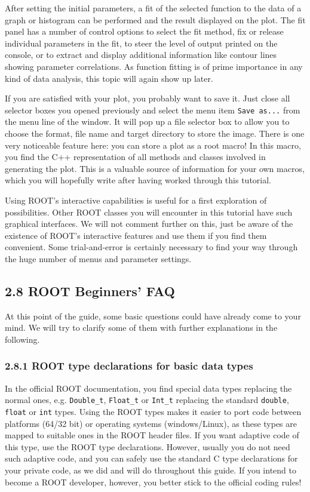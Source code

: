 \documentclass{article}
\begin{document}
After setting the initial parameters, a fit of the selected function to
the data of a graph or histogram can be performed and the result
displayed on the plot. The fit panel has a number of control options to
select the fit method, fix or release individual parameters in the fit,
to steer the level of output printed on the console, or to extract and
display additional information like contour lines showing parameter
correlations. As function fitting is of prime importance in any kind of
data analysis, this topic will again show up later.

If you are satisfied with your plot, you probably want to save it. Just
close all selector boxes you opened previously and select the menu item
\texttt{Save\ as...} from the menu line of the window. It will pop up a
file selector box to allow you to choose the format, file name and
target directory to store the image. There is one very noticeable
feature here: you can store a plot as a root macro! In this macro, you
find the C++ representation of all methods and classes involved in
generating the plot. This is a valuable source of information for your
own macros, which you will hopefully write after having worked through
this tutorial.

Using ROOT's interactive capabilities is useful for a first exploration
of possibilities. Other ROOT classes you will encounter in this tutorial
have such graphical interfaces. We will not comment further on this,
just be aware of the existence of ROOT's interactive features and use
them if you find them convenient. Some trial-and-error is certainly
necessary to find your way through the huge number of menus and
parameter settings.

\subsection{2.8 ROOT Beginners' FAQ}\label{root-beginners-faq}

At this point of the guide, some basic questions could have already come
to your mind. We will try to clarify some of them with further
explanations in the following.

\subsubsection{2.8.1 ROOT type declarations for basic data
types}\label{root-type-declarations-for-basic-data-types}

In the official ROOT documentation, you find special data types
replacing the normal ones, e.g. \texttt{Double\_t}, \texttt{Float\_t} or
\texttt{Int\_t} replacing the standard \texttt{double}, \texttt{float}
or \texttt{int} types. Using the ROOT types makes it easier to port code
between platforms (64/32 bit) or operating systems (windows/Linux), as
these types are mapped to suitable ones in the ROOT header files. If you
want adaptive code of this type, use the ROOT type declarations.
However, usually you do not need such adaptive code, and you can safely
use the standard C type declarations for your private code, as we did
and will do throughout this guide. If you intend to become a ROOT
developer, however, you better stick to the official coding rules!
\end{document}
